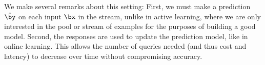 We make several remarks about this setting:
First, we must make a prediction $\hat \by$ on each input $\bx$ in the stream,
unlike in active learning, where we are only interested in the pool or stream of examples
for the purposes of building a good model.
Second, the responses are used to update the prediction model, like in online learning.
This allows the number of queries needed (and thus cost and latency) to decrease over time
without compromising accuracy.

